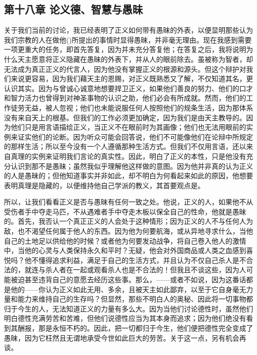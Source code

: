
\subsection{第十八章 论义德、智慧与愚昧}

关于我们当前的讨论，我已经表明了正义如何带有愚昧的外表，以便显明那些认为我们宗教的人在做他()所提出的事情时显得愚昧，并非毫无理由。现在我感到需要一项更重大的任务，即首先答复，因为并未充分答复他；在答复之后，我将说明为什么天主愿意将正义隐藏在愚昧的外表下，并从人的眼前除去。虽被称为智者，却无法成为真正正义的代言人，因为他没有掌握正义的根源和源头。但这个辩护对我们来说更容易，因为我们藉天主的恩赐，对正义既熟悉又了解，不仅知道其名，更认识其实。因为与曾诚心诚意地想要捍卫正义，如果他们善良的努力、他们的口才和智力活力也曾得到对神圣事物的认识之助，他们必会有所成就。然而，他们的工作徒劳无益，被人忽视；他们也未能说服任何人按照他们的规条生活，因为那体系没有来自天上的根基。但我们的工作必须更加确定，因为我们是由天主教导的。因为他们只是用言语描绘正义，当正义不在眼前时为其画像；他们也无法用眼前的实例来证实他们的论断。因为听众可能会回答说，他们不可能像他们在论辩中所规定的那样生活；所以至今没有一个人遵循那种生活方式。但我们不仅用言语，还以来自真理的实例来证明我们言论的真实性。因此，明白了正义的本性，只是他没有充分认识到那不是愚昧；虽然我似乎理解他这样做的意图。因为他并非真的认为正义的人是愚昧的；但他知道事实并非如此，却不明白为何看起来如此的原因，他想要表明真理是隐藏的，以便维持他自己学派的教义，其首要观点是。\par

所以，让我们看看正义是否与愚昧有任何一致之处。他说，正义的人，如果他不从受伤者手中夺走马匹，不从遇难者手中夺走木板以保全自己的性命，他就是愚昧的。首先，我否认一个真正正义的人会处于这种情形；因为正义的人不与任何人为敌，也不渴望任何属于他人的东西。因为他为何要航海，或从异地寻求什么，当他自己的土地足以供给他的时候？或者他为何要发动战争，将自己卷入他人的激情中，当他的心灵与人类保持永久和平时？无疑，他会对外国商品或人类之血感到喜悦吗？他不懂得追求利益，满足于自己的生活方式，并且认为不仅自己杀人是不合法的，就连与杀人者在一起或观看杀人也是不合法的！但我且不谈这些，因为人可能被迫甚至违背自己的意愿去经历这些事。那么，——或者不如说，因为这番话都是他的——你认为正义如此无用、多余，且被天主如此鄙弃，以至于它自身毫无力量和能力来维持自己的生存吗？但显然，那些不明白人的奥秘、因此将一切事物都归于今生的人，无法知道正义的力量有多么大。因为当他们讨论德性时，虽然他们明白德性充满劳苦和苦难，但他们说德性应当为其本身而追求；因为他们绝没有看到其酬报，那是永恒不朽的。因此，把一切都归于今生，他们便把德性完全变成了愚昧，因为它枉然且无谓地承受今世如此巨大的劳苦。关于这一点，另有机会再谈。\par

